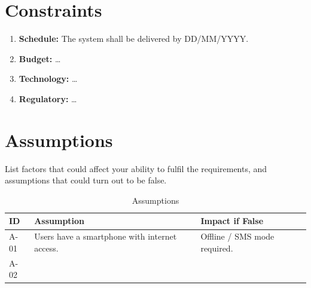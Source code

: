 \section{Constraints}\label{sec:constraints}
\begin{enumerate}[label=\textbf{CON-\arabic*}, leftmargin=4em]
  \item \textbf{Schedule:} The system shall be delivered by DD/MM/YYYY.
  \item \textbf{Budget:} \ldots
  \item \textbf{Technology:} \ldots
  \item \textbf{Regulatory:} \ldots
\end{enumerate}

\section{Assumptions}\label{sec:assumptions}
\begin{guidance}
List factors that could affect your ability to fulfil the requirements, and assumptions that could turn out to be false.
\end{guidance}

\begin{table}[H]
\centering
\caption{Assumptions}\label{tab:assumptions}
\begin{tabularx}{\textwidth}{|L{1.5cm}|X|X|}
\hline
{}\sffamily\bfseries ID & \sffamily\bfseries Assumption & \sffamily\bfseries Impact if False \\ \hline
A-01 & Users have a smartphone with internet access. & Offline / SMS mode required. \\ \hline
A-02 & & \\ \hline
\end{tabularx}
\end{table}
